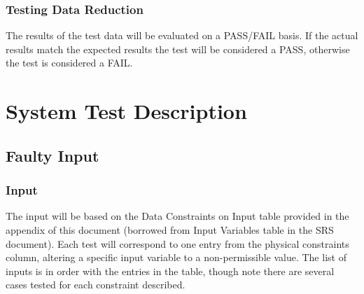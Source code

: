 \documentclass[12pt]{article}
\begin{document}
\subsubsection{ Testing Data Reduction}
The results of the test data will be evaluated on a PASS/FAIL basis. If the actual 
results match the expected
results the test will be considered a PASS, otherwise the test is considered a FAIL. 


%
%

\section{System Test Description}


\subsection{Faulty Input}

\subsubsection{ Input}
The input will be based on the Data Constraints on Input table provided 
in the appendix of this document (borrowed from Input Variables table in the SRS document). Each test will correspond to one entry from 
the physical constraints column, altering a specific input variable to a non-permissible
 value. The list of inputs is in order with the entries in the table, though note there are several cases tested for each constraint described.
\end{document}
